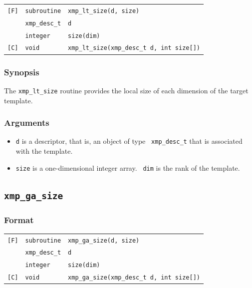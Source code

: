 \begin{tabular}{lll}

\verb![F]!& {\tt subroutine}& {\tt xmp\_lt\_size(d, size)}\\
          & {\tt xmp\_desc\_t} & {\tt d}\\
          & {\tt integer} & {\tt size(dim)}\\

\verb![C]!&  {\tt void}& {\tt xmp\_lt\_size(xmp\_desc\_t d, int size[])}\\

\end{tabular}

\subsubsection*{Synopsis}

The {\tt xmp\_lt\_size} routine provides the local size of each dimension
of the target template.

\subsubsection*{Arguments}

\begin{itemize}
 \item {\tt d} is a descriptor, that is, an object of type {\tt
       xmp\_desc\_t} that is associated with the template.
 \item {\tt size} is a one-dimensional integer array. {\tt
       dim} is the rank of the template.
\end{itemize}


\subsection{\tt xmp\_ga\_size}

\subsubsection*{Format}

\begin{tabular}{lll}

\verb![F]!& {\tt subroutine}& {\tt xmp\_ga\_size(d, size)}\\
          & {\tt xmp\_desc\_t} & {\tt d}\\
          & {\tt integer} & {\tt size(dim)}\\

\verb![C]!&  {\tt void}& {\tt xmp\_ga\_size(xmp\_desc\_t d, int size[])}\\

\end{tabular}

